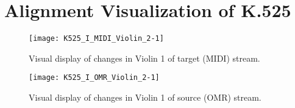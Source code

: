 \chapter{Alignment Visualization of K.525}\label{appb}
\clearpage

\begin{figure}[H]
\centering
\texttt{[image: K525\_I\_MIDI\_Violin\_2-1]}
\caption{Visual display of changes in Violin 1 of target (MIDI) stream.}
\end{figure}

\begin{figure}[H]
\centering
\texttt{[image: K525\_I\_OMR\_Violin\_2-1]}
\caption{Visual display of changes in Violin 1 of source (OMR) stream.}
\end{figure}



\clearpage
\newpage
